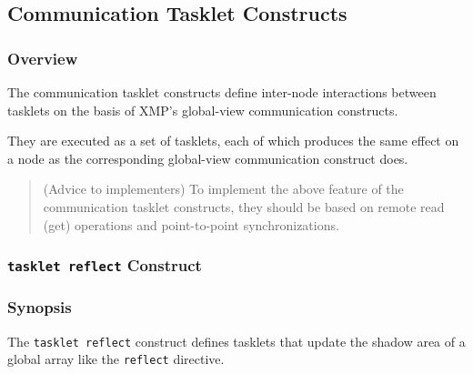

%
%

\subsection{Communication Tasklet Constructs}

\subsubsection{Overview}

The communication tasklet constructs define inter-node interactions
between tasklets on the basis of XMP's global-view communication
constructs.

They are executed as a set of tasklets, each of which produces the same
effect on a node as the corresponding global-view communication
construct does.

\begin{quotation}
  (Advice to implementers) To implement the above feature of the
  communication tasklet constructs, they should be based on
  remote read (get) operations and point-to-point synchronizations.
\end{quotation}



%
%

\subsubsection{{\tt tasklet reflect} Construct}

\subsubsection*{Synopsis}

The \verb|tasklet reflect| construct defines tasklets that update the
shadow area of a global array like the \verb|reflect| directive.

